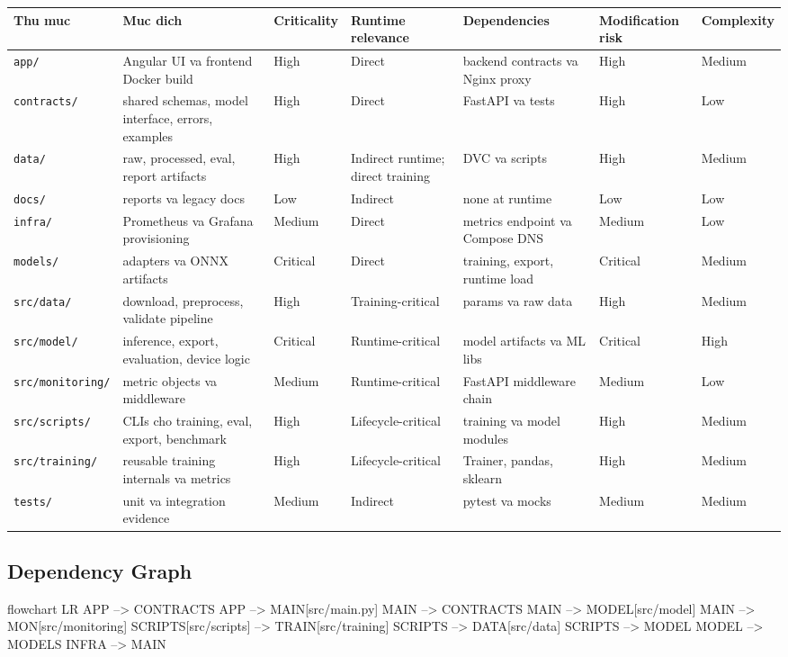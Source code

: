 \begin{longtable}{@{}p{}p{}p{}p{}p{}p{}p{}@{}}
\toprule
\textbf{Thu muc} & \textbf{Muc dich} & \textbf{Criticality} & \textbf{Runtime relevance} & \textbf{Dependencies} & \textbf{Modification risk} & \textbf{Complexity} \\
\midrule
\endhead
\texttt{app/} & Angular UI va frontend Docker build & High & Direct & backend contracts va Nginx proxy & High & Medium \\
\texttt{contracts/} & shared schemas, model interface, errors, examples & High & Direct & FastAPI va tests & High & Low \\
\texttt{data/} & raw, processed, eval, report artifacts & High & Indirect runtime; direct training & DVC va scripts & High & Medium \\
\texttt{docs/} & reports va legacy docs & Low & Indirect & none at runtime & Low & Low \\
\texttt{infra/} & Prometheus va Grafana provisioning & Medium & Direct & metrics endpoint va Compose DNS & Medium & Low \\
\texttt{models/} & adapters va ONNX artifacts & Critical & Direct & training, export, runtime load & Critical & Medium \\
\texttt{src/data/} & download, preprocess, validate pipeline & High & Training-critical & params va raw data & High & Medium \\
\texttt{src/model/} & inference, export, evaluation, device logic & Critical & Runtime-critical & model artifacts va ML libs & Critical & High \\
\texttt{src/monitoring/} & metric objects va middleware & Medium & Runtime-critical & FastAPI middleware chain & Medium & Low \\
\texttt{src/scripts/} & CLIs cho training, eval, export, benchmark & High & Lifecycle-critical & training va model modules & High & Medium \\
\texttt{src/training/} & reusable training internals va metrics & High & Lifecycle-critical & Trainer, pandas, sklearn & High & Medium \\
\texttt{tests/} & unit va integration evidence & Medium & Indirect & pytest va mocks & Medium & Medium \\
\bottomrule
\end{longtable}

\subsection{Dependency Graph}
\begin{mermaidblock}
flowchart LR
  APP --> CONTRACTS
  APP --> MAIN[src/main.py]
  MAIN --> CONTRACTS
  MAIN --> MODEL[src/model]
  MAIN --> MON[src/monitoring]
  SCRIPTS[src/scripts] --> TRAIN[src/training]
  SCRIPTS --> DATA[src/data]
  SCRIPTS --> MODEL
  MODEL --> MODELS
  INFRA --> MAIN
\end{mermaidblock}

